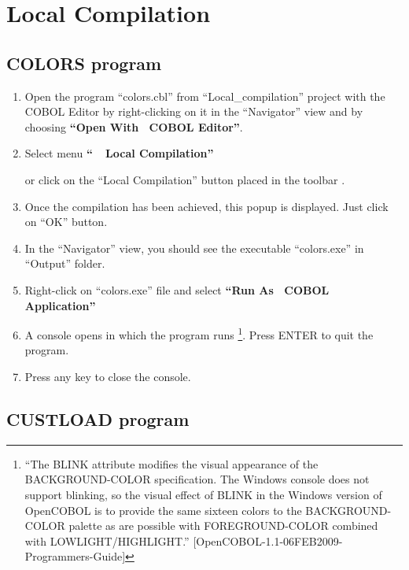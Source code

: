 \chapter{Local Compilation}

\section{COLORS program}

\begin{enumerate}
\item Open the program ``colors.cbl'' from ``Local\_compilation'' project with the COBOL Editor by right-clicking on it in the ``Navigator'' view and by choosing \textbf{``Open With \RHD~COBOL Editor''}.

\item Select menu \textbf{``\mxproduct~\RHD~Local Compilation''}
\\ \parbox{8cm}{or click on the ``Local Compilation'' button placed in the toolbar .}

\item Once the compilation has been achieved, this popup is displayed.
Just click on ``OK'' button.

\item In the ``Navigator'' view, you should see the executable ``colors.exe'' in ``Output'' folder.

\item Right-click on ``colors.exe'' file and select \textbf{``Run As \RHD~COBOL Application''}

\item A console opens in which the program runs
\footnote{``The BLINK attribute modifies the visual appearance of the BACKGROUND-COLOR specification. The Windows console does not support blinking, so the visual effect of BLINK in the Windows version of OpenCOBOL is to provide the same sixteen colors to the BACKGROUND-COLOR palette as are possible with FOREGROUND-COLOR combined with LOWLIGHT/HIGHLIGHT.'' [OpenCOBOL-1.1-06FEB2009-Programmers-Guide]}.
Press ENTER to quit the program.

\item Press any key to close the console.
\end{enumerate}


\section{CUSTLOAD program}

